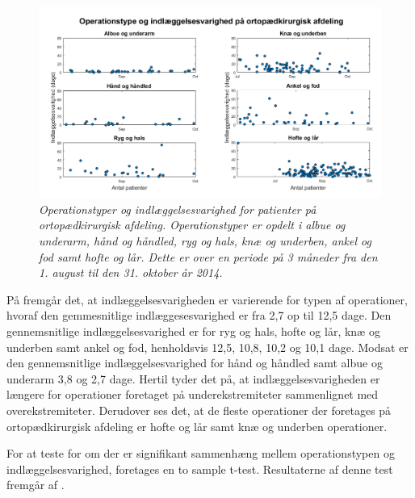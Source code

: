 \begin{figure}[H]
	\centering
	\includegraphics[scale=0.5]{figures/operaogindlaeg}
	\caption{\textit{Operationstyper og indlæggelsesvarighed for patienter på ortopædkirurgisk afdeling. Operationstyper er opdelt i albue og underarm, hånd og håndled, ryg og hals, knæ og underben, ankel og fod samt hofte og lår. Dette er over en periode på 3 måneder fra den 1. august til den 31. oktober år 2014.}}
	\label{opvsindlaegtid}
\end{figure}


\noindent
På  fremgår det, at indlæggelsesvarigheden er varierende for typen af operationer, hvoraf den gemmesnitlige indlæggesesvarighed er fra 2,7 op til 12,5 dage. Den gennemsnitlige indlæggelsesvarighed er for ryg og hals, hofte og lår, knæ og underben samt ankel og fod, henholdsvis 12,5, 10,8, 10,2 og 10,1 dage. Modsat er den gennemsnitlige indlæggelsesvarighed for hånd og håndled samt albue og underarm 3,8 og 2,7 dage. Hertil tyder det på, at indlæggelsesvarigheden er længere for operationer foretaget på underekstremiteter sammenlignet med overekstremiteter. Derudover ses det, at de fleste operationer der foretages på ortopædkirurgisk afdeling er  hofte og lår samt knæ og underben operationer. 

For at teste for om der er signifikant sammenhæng mellem operationstypen og indlæggelsesvarighed, foretages en to sample t-test. Resultaterne af denne test fremgår af .

